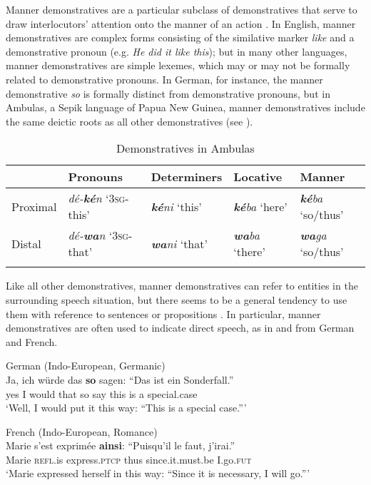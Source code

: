 \documentclass[output=paper,colorlinks,citecolor=brown]{langscibook}
\begin{document}
Manner demonstratives are a particular subclass of demonstratives that serve to draw interlocutors’ attention onto the manner of an action \citep{König2012}. In English, manner demonstratives are complex forms consisting of the similative marker \textit{like} and a demonstrative pronoun (e.g. \textit{He did it like this}); but in many other languages, manner demonstratives are simple lexemes, which may or may not be formally related to demonstrative pronouns. In German, for instance, the manner demonstrative \textit{so} is formally distinct from demonstrative pronouns, but in Ambulas, a Sepik language of Papua New Guinea, manner demonstratives include the same deictic roots as all other demonstratives (see ).

\begin{table}
\begin{tabularx}{\textwidth}{lXlll}
\lsptoprule
& {Pronouns} & {Determiners} & {Locative}  & {Manner}\\
\midrule
Proximal & {\textit{dé-\textbf{ké}n} ‘\textsc{3sg}-this’} & {\textit{\textbf{ké}ni} ‘this’} & {\textit{\textbf{ké}ba} ‘here’} & {\textit{\textbf{ké}ba} ‘so/thus’}\\
Distal & {\textit{dé-\textbf{wa}n} \textsc{‘3sg}-that’} & {\textit{\textbf{wa}ni} ‘that’} & 
{\textit{\textbf{wa}ba} ‘there’} & {\textit{\textbf{wa}ga} ‘so/thus’}\\
\lspbottomrule
\end{tabularx}
\caption{Demonstratives in Ambulas \citep[56-7]{Wilson1980}}
\label{tab:diessel:1}
\end{table}

Like all other demonstratives, manner demonstratives can refer to entities in the surrounding speech situation, but there seems to be a general tendency to use them with reference to sentences or propositions \citep{König2012}. In particular, manner demonstratives are often used to indicate direct speech, as in  and  from German and French.

\ea\label{ex:diessel:11}
{German (Indo-European, Germanic)}\\
\gll Ja, ich würde das \textbf{so} sagen: “Das ist ein Sonderfall.”\\
     yes I would that so say {\db}this is a special.case\\
\glt ‘Well, I would put it this way: “This is a special case.”’
\z

\ea\label{ex:diessel:12}
{French (Indo-European, Romance)}\\
\gll Marie s’est exprimée \textbf{ainsi}: “{Puisqu’il le faut}, j’irai.”\\
     Marie \textsc{refl.}is express.\textsc{ptcp} thus {\db}{since.it.must.be} I.go.\textsc{fut}\\
\glt ‘Marie expressed herself in this way: “Since it is necessary, I will go.”’
\z
\end{document}
